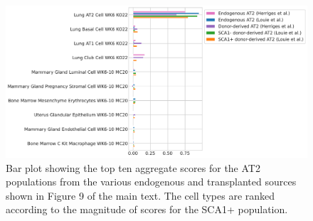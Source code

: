 \documentclass[aps,superscriptaddress, notitlepage,longbibliography]{revtex4-1}
\begin{document}
\begin{figure}
	\centering
	\includegraphics[scale=0.4]{figs/lung barplot.pdf}
	\caption{Bar plot showing the top ten aggregate scores for the AT2 populations from the various endogenous and transplanted sources shown in Figure 9 of the main text. The cell types are ranked according to the magnitude of scores for the SCA1+ population.}
    \label{barplot}
\end{figure}


\end{document}
